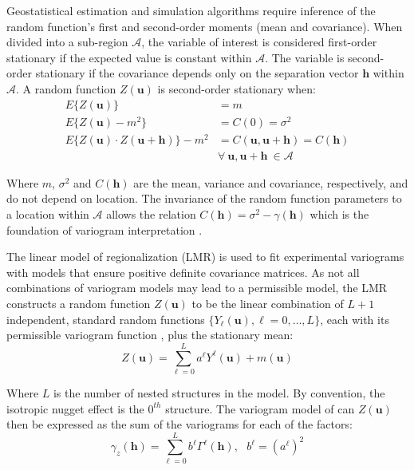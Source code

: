 Geostatistical estimation and simulation algorithms require inference of the random function's first and second-order moments (mean and covariance). When divided into a sub-region $\mathcal{A}$, the variable of interest is considered first-order stationary if the expected value is constant within $\mathcal{A}$. The variable is second-order stationary if the covariance depends only on the separation vector $\mathbf{h}$ within $\mathcal{A}$. A random function $Z(\mathbf{u})$ is second-order stationary when:
\begin{align*}
    E\{Z(\mathbf{u})\}                                        & = m                                                           \\
    E\{Z(\mathbf{u}) - m^2\}                                  & = C(0) = \sigma^2                                             \\
    E\{Z(\mathbf{u}) \cdot Z(\mathbf{u} + \mathbf{h})\} - m^2 & = C(\mathbf{u}, \mathbf{u}+\mathbf{h}) = C(\mathbf{h})        \\
                                                              & \forall \ \mathbf{u}, \mathbf{u}+\mathbf{h} \ \in \mathcal{A}
\end{align*}

Where $m$, $\sigma^2$ and $C(\mathbf{h})$ are the mean, variance and covariance, respectively, and do not depend on location. The invariance of the random function parameters to a location within $\mathcal{A}$ allows the relation $C(\mathbf{h}) = \sigma^2 - \gamma(\mathbf{h})$ which is the foundation of variogram interpretation \citep{pyrcz2014geostatistical}.

The linear model of regionalization (LMR) is used to fit experimental variograms with models that ensure positive definite covariance matrices. As not all combinations of variogram models may lead to a permissible model, the LMR constructs a random function $Z(\mathbf{u})$ to be the linear combination of $L+1$ independent, standard random functions $\{Y_{\ell}(\mathbf{u}), \ell=0,\dots,L\}$, each with its permissible variogram function \citep{goovaerts1997geostatistics}, plus the stationary mean:
\begin{equation*}
    Z(\mathbf{u}) = \sum_{\ell=0}^{L} a^{\ell} Y^{\ell}(\mathbf{u}) + m(\mathbf{u})
\end{equation*}

Where $L$ is the number of nested structures in the model. By convention, the isotropic nugget effect is the $0^{th}$ structure. The variogram model of can $Z(\mathbf{u})$ then be expressed as the sum of the variograms for each of the factors:
\begin{equation*}
    \gamma_z(\mathbf{h}) = \sum_{\ell=0}^{L} b^{\ell} \Gamma^{\ell}(\mathbf{h}), \ \ \ b^{\ell} = (a^{\ell})^{2}
\end{equation*}

